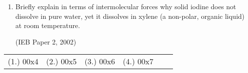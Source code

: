 \begin{eocexercises}{}
\begin{enumerate}
\item{Briefly explain in terms of intermolecular forces why solid iodine does not dissolve in pure water, yet it dissolves in xylene (a non-polar, organic liquid) at room temperature.}

(IEB Paper 2, 2002)

\end{enumerate}

\practiceinfo

\begin{tabular}[h]{cccccc}
(1.) 00x4 & (2.) 00x5 & (3.) 00x6 & (4.) 00x7 & 
 \end{tabular}
\end{eocexercises}







